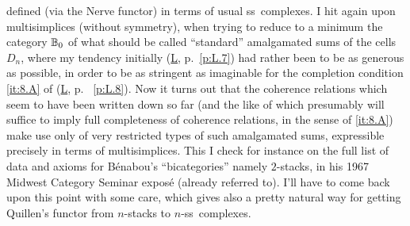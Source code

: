 defined (via the Nerve functor) in terms of usual ss~complexes. I hit
again upon multisimplices (without symmetry), when trying to reduce to
a minimum the category ${\mathbb{B}}_0$ of what should be called ``standard''
amalgamated sums of the cells $D_n$, where my tendency initially
(\hyperref[ch:I]L, p.~\ref{p:L.7}) had rather been to be as generous
as possible, in order to be as stringent as imaginable for the
completion condition \ref{it:8.A} of (\hyperref[ch:I]L, p.~%
\ref{p:L.8}).  Now it turns out that the coherence relations which
seem to have been written down so far (and the like of which
presumably will suffice to imply full completeness of coherence
relations, in the sense of \ref{it:8.A}) make use only of very
restricted types of such amalgamated sums, expressible precisely in
terms of multisimplices. This I check for instance on the full list of
data and axioms for B\'enabou's ``bicategories'' namely $2$-stacks, in
his 1967 Midwest Category Seminar expos\'e (already referred to). I'll
have to come back upon this point with some care, which gives also a
pretty natural way for getting Quillen's functor from $n$-stacks to
$n$-ss~complexes.

